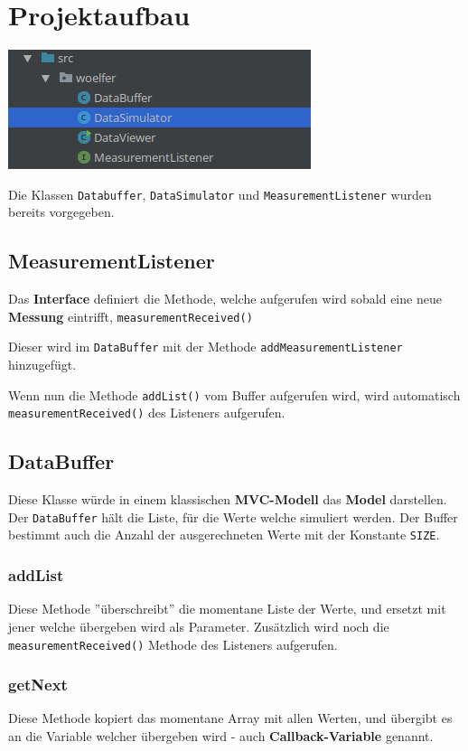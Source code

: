 \section{Projektaufbau}
\begin{minipage}{\linewidth}
	\centering
	\includegraphics[width=0.5\linewidth]{images/projekt}
\end{minipage}

Die Klassen \verb|Databuffer|, \verb|DataSimulator| und \verb|MeasurementListener| wurden bereits vorgegeben.

\subsection{MeasurementListener}
Das \textbf{Interface} definiert die Methode, welche aufgerufen wird sobald eine neue \textbf{Messung} eintrifft, \verb|measurementReceived()| 

Dieser wird im \verb|DataBuffer| mit der Methode \verb|addMeasurementListener| hinzugefügt. 

Wenn nun die Methode \verb|addList()| vom Buffer aufgerufen wird, wird automatisch \verb|measurementReceived()| des Listeners aufgerufen.

\subsection{DataBuffer}
Diese Klasse würde in einem klassischen \textbf{MVC-Modell} das \textbf{Model} darstellen. Der \verb|DataBuffer| hält die Liste, für die Werte welche simuliert werden. Der Buffer bestimmt auch die Anzahl der ausgerechneten Werte mit der Konstante \verb|SIZE|.

\subsubsection{addList}
Diese Methode ''überschreibt'' die momentane Liste der Werte, und ersetzt mit jener welche übergeben wird als Parameter. Zusätzlich wird noch die \verb|measurementReceived()| Methode des Listeners aufgerufen.

\subsubsection{getNext}
Diese Methode kopiert das momentane Array mit allen Werten, und übergibt es an die Variable welcher übergeben wird - auch \textbf{Callback-Variable} genannt. 

